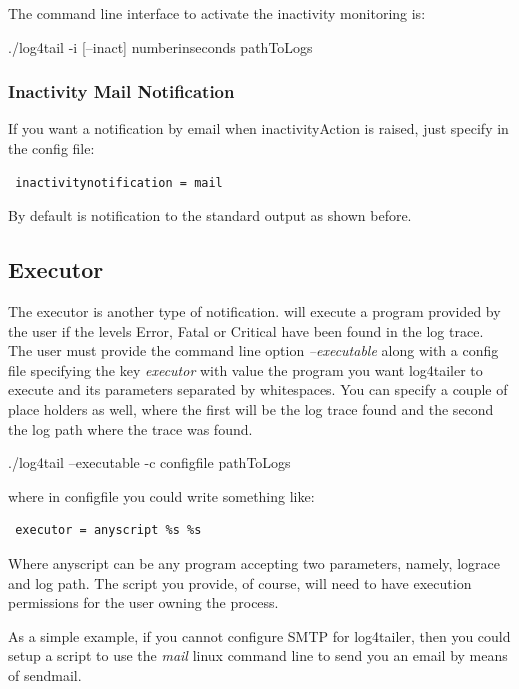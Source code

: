 The command line interface to activate the inactivity monitoring is:
\begin{cmd}
 ./log4tail -i [--inact] numberinseconds pathToLogs
\end{cmd}

\subsubsection{Inactivity Mail Notification}
If you want a notification by email when inactivityAction is raised, just specify in the 
config file:
\begin{verbatim}
 inactivitynotification = mail
\end{verbatim}
By default is notification to the standard output as shown before. 

\subsection{Executor}
\label{sec:executor}

The executor is another type of notification. \logftailer{} will execute a program provided 
by the user if the levels Error, Fatal or Critical have been found in the log trace. The user 
must provide the command line option \emph{--executable} along with a config file specifying 
the key \emph{executor} with value the program you want log4tailer to execute and its parameters 
separated by whitespaces. You can specify a couple of place holders as well, where the first will 
be the log trace found and the second the log path where the trace was found.

\begin{cmd}
 ./log4tail --executable -c configfile pathToLogs
\end{cmd}

where in configfile you could write something like:

\begin{verbatim}
 executor = anyscript %s %s 
\end{verbatim}

Where anyscript can be any program accepting two parameters, namely, lograce and log path. The script 
you provide, of course, will need to have execution permissions for the user 
owning the \logftailer{} process. 

As a simple example, if you cannot configure SMTP for log4tailer, then you could 
setup a script to use the \emph{mail} linux command line to send you an email by means of sendmail.

